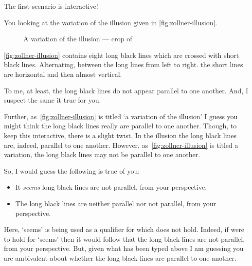 \begin{note}
  The first scenario is interactive!

  \begin{scenario}
    You looking at the variation of the \citeauthor{Zollner:1860vx} illusion given in \autoref{fig:zollner-illusion}.
    \begin{figure}[!h]
      \centering
      \def\svgwidth{\columnwidth}
      
      \caption{A variation of the \citeauthor{Zollner:1860vx} illusion --- crop of ~\textcite{Fibonacci:2007vj}}
      \label{fig:zollner-illusion}
    \end{figure}
  \end{scenario}

  \autoref{fig:zollner-illusion} contains eight long black lines which are crossed with short black lines.
  Alternating, between the long lines from left to right. the short lines are horizontal and then almost vertical.

  To me, at least, the long black lines do not appear parallel to one another.
  And, I suspect the same it true for you.

  Further, as~\autoref{fig:zollner-illusion} is titled `a variation of the \citeauthor{Zollner:1860vx} illusion' I guess you might think the long black lines really are parallel to one another.
  Though, to keep this interactive, there is a slight twist.
  In the \citeauthor{Zollner:1860vx} illusion the long black lines are, indeed, parallel to one another.
  However, as~\autoref{fig:zollner-illusion} is titled a variation, the long black lines may not be parallel to one another.

  So, I would guess the following is true of you:

  \begin{itemize}[noitemsep]
  \item
    It \emph{seems} long black lines are not parallel, from your perspective.
  \item
    The long black lines are neither parallel nor not parallel, from your perspective.
  \end{itemize}

  Here, `seems' is being used as a qualifier for which \ptivity{} does not hold.
  Indeed, if \ptivity{} were to hold for `seems' then it would follow that the long black lines are not parallel, from your perspective.
  But, given what has been typed above I am guessing you are ambivalent about whether the long black lines are parallel to one another.


\end{note}
